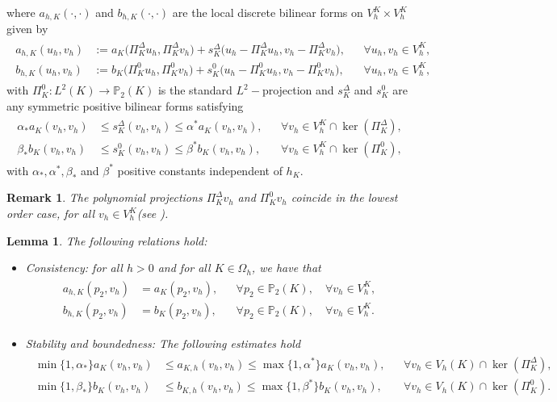 \documentclass[final,reqno]{elsarticle}
\newtheorem{lemma}{Lemma}[section]
\newtheorem{remark}{Remark}[section]
\def\E{K}
\def\P{\mathbb{P}}
\def\PiK{\Pi_{K}^{\Delta}}
\begin{document}
%
where $a_{h,\E}(\cdot,\cdot)$ and $b_{h,\E}(\cdot,\cdot)$
are the local discrete bilinear forms on
$  V_h^K      \times  V_h^K      $  given by
\begin{align}
\begin{aligned}
a_{h,\E}(u_h,v_h)
&:=a_{\E}\big(\PiK u_h,\PiK v_h\big)
+s_{\E}^{\Delta}\big(u_h-\PiK u_h,v_h-\PiK v_h\big),
&&\forall u_h,v_h\in  V_h^K      ,\\
b_{h,\E}(u_h,v_h)\label{locforma2}
&:=b_{\E}\big(\Pi_K^0 u_h,\Pi_K^0 v_h\big) +s_{\E}^0\big(u_h-\Pi_K^0 u_h,v_h-\Pi_K^0 v_h\big),
&&\forall u_h,v_h\in  V_h^K, 
\end{aligned}
\end{align}
with $\Pi_K^0:L^2(K) \to \mathbb{P}_2(K)$ is the standard $L^2-$projection and  $s_{\E}^{\Delta}$ and $s_{\E}^0$ are any symmetric positive bilinear forms satisfying  
\begin{align*}
\begin{aligned}
\alpha_{*}a_{\E}(v_h,v_h)&\leq s_{\E}^{\Delta}(v_h,v_h)\leq  \alpha^{*}a_{\E}(v_h,v_h), 
&&\forall v_h\in V_h^\E\cap\ker(\Pi_{\E}^{\Delta}),\\
\beta_{*}b_{\E}(v_h,v_h)&\leq s_{\E}^{0}(v_h,v_h)\leq \beta^{*}b_{\E}(v_h,v_h),
&&\forall v_h\in V_h^\E\cap\ker(\Pi_{\E}^{0}),
\end{aligned}    
\end{align*}
with $\alpha_{*},\alpha^{*},\beta_{*}$ and $\beta^{*}$ positive constants independent of $h_K$.
\begin{remark}
    The polynomial projections $\PiK v_h$ and $\Pi_K^0 v_h$  coincide in the lowest order case, for all $v_h\in V_h^K$(see \cite{MRV2018}).
\end{remark}
\begin{lemma}\label{consandstability}
    The following relations hold:
\begin{itemize}
\item \textit{Consistency}: for all $h > 0$ and for all $\E\in\Omega_h$, we have that
\begin{align*}
\begin{aligned}
a_{h,\E}(p_2,v_h)
&=a_{\E}(p_2,v_h),
&&\forall p_2\in\P_2(\E),
\quad\forall v_h\in  V_h^K,\\ %
b_{h,\E}(p_2,v_h)
&=b_{\E}(p_2,v_h),
&&\forall p_2\in\P_2(\E),
\quad\forall v_h\in  V_h^K.      %
\end{aligned}
\end{align*}
%
\item \textit{Stability and
boundedness}: The following estimates hold
\begin{align*}
\begin{aligned}
\min\{1, \alpha_{*}\}a_{\E}(v_h,v_h)&\leq a_{\E,h}(v_h,v_h)\leq \max\{1,\alpha^{*}\}a_{\E}(v_h,v_h), 
&&\forall v_h\in V_h(\E)\cap\ker(\Pi_{\E}^{\Delta}),\\
\min\{1, \beta_{*}\}b_{\E}(v_h,v_h)&\leq b_{\E,h}(v_h,v_h)\leq \max\{1,\beta^{*}\}b_{\E}(v_h,v_h),
&&\forall v_h\in V_h(\E)\cap\ker(\Pi_{\E}^{0}).
\end{aligned}    
\end{align*}
\end{itemize}
\end{lemma}
\end{document}
